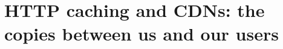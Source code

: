 \chapter{HTTP caching and CDNs: the copies between us and our users}
\label{ch:http-caching-and-cdns-the-copies}

